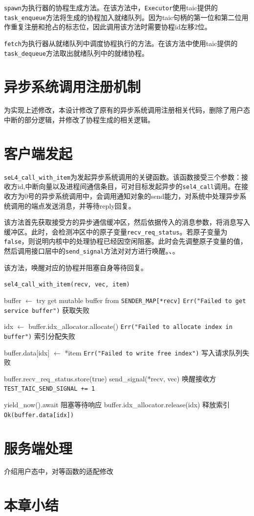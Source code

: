 \texttt{spawn}为执行器的协程生成方法。在该方法中，\texttt{Executor}使用taic提供的\texttt{task\_enqueue}方法将生成的协程加入就绪队列。因为taic句柄的第一位和第二位用作重复注册和抢占的标志位，因此调用该方法时需要协程id左移2位。

\texttt{fetch}为执行器从就绪队列中调度协程执行的方法。在该方法中使用taic提供的\texttt{task\_dequeue}方法取出就绪队列中的就绪协程。


\section{异步系统调用注册机制}

为实现上述修改，本设计修改了原有的异步系统调用注册相关代码，删除了用户态中断的部分逻辑，并修改了协程生成的相关逻辑。

\section{客户端发起}

\texttt{seL4\_call\_with\_item}为发起异步系统调用的关键函数。该函数接受三个参数：接收方id,中断向量以及进程间通信条目，可对目标发起异步的\texttt{sel4\_call}调用。在接收方为0号的异步系统调用中，会调用通知对象的send能力，对系统中处理异步系统调用的端点发送消息，并等待reply回复。

该方法首先获取接受方的异步通信缓冲区，然后依据传入的消息参数，将消息写入缓冲区。此时，会检测冲区中的原子变量\texttt{recv\_req\_status}。若原子变量为\texttt{false}，则说明内核中的处理协程已经因空闲阻塞。此时会先调整原子变量的值，然后调用接口层中的\texttt{send\_signal}方法对对方进行唤醒。、。

该方法，唤醒对应的协程并阻塞自身等待回复。

\begin{algorithm}
\caption{\texttt{sel4\_call\_with\_item(recv, vec, item)}}
\begin{algorithmic}[0]  %
\State buffer $\gets$ try get mutable buffer from \texttt{SENDER\_MAP[*recv]}
    \State \Return \texttt{Err("Failed to get service buffer")} \Comment 获取失败
\EndIf

\State idx $\gets$ buffer.idx\_allocator.allocate()
    \State \Return \texttt{Err("Failed to allocate index in buffer")} \Comment 索引分配失败
\EndIf

\State buffer.data[idx] $\gets$ *item
    \State \Return \texttt{Err("Failed to write free index")} \Comment 写入请求队列失败
\EndIf

    \State buffer.recv\_req\_status.store(true)
    \State send\_signal(*recv, vec) \Comment 唤醒接收方
    \State \texttt{TEST\_TAIC\_SEND\_SIGNAL += 1}
\EndIf

\State yield\_now().await \Comment 阻塞等待响应
\State buffer.idx\_allocator.release(idx) \Comment 释放索引
\State \Return \texttt{Ok(buffer.data[idx])}
\end{algorithmic}
\end{algorithm}

\section{服务端处理}


介绍用户态中，对等函数的适配修改

\section{本章小结}
